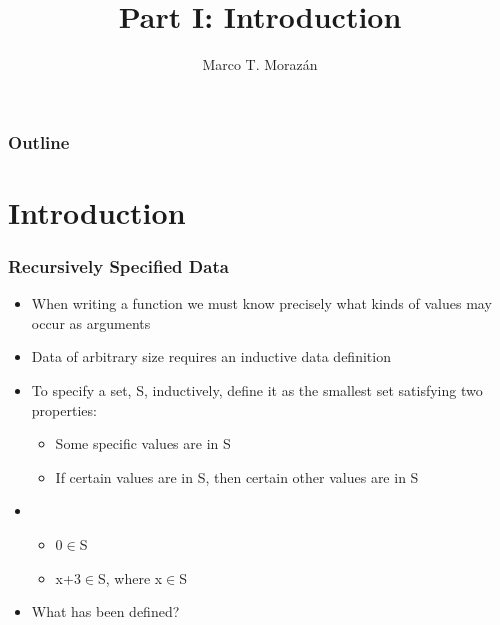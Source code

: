 \documentclass{beamer}
\begin{document}
\title{Part I: Introduction}
\author{Marco T. Moraz\'{a}n}
\date{}

\begin{frame}
\titlepage
\end{frame}

\begin{frame}
\frametitle{Outline}
\tableofcontents
\end{frame}

\section{Introduction}

\begin{frame}[fragile]
\frametitle{Recursively Specified Data}
\begin{scriptsize}
\begin{itemize}
\item<1-> When writing a function we must know precisely what kinds of values may occur as arguments

\item<2-> Data of arbitrary size requires an inductive data definition

\item<2-> To specify a set, S, inductively, define it as the smallest set satisfying two properties:
  \begin{itemize}
    \item<2-> Some specific values are in S
    \item<2-> If certain values are in S, then certain other values are in S
  \end{itemize}

\item<3->
  \begin{itemize}
    \item<2-> 0$\in$S
    \item<2-> x+3$\in$S, where x$\in$S
  \end{itemize}

\item<3-> What has been defined?

\end{itemize}
\end{scriptsize}
\end{frame}
\end{document}
